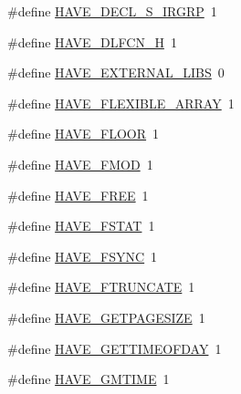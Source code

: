 \begin{DoxyCompactItemize}
\#define \hyperlink{mac_2config_2i386_2lib-src_2libsndfile_2src_2config_8h_a595bc9b53a318c90496e38ba98a79008}{H\+A\+V\+E\+\_\+\+D\+E\+C\+L\+\_\+\+S\+\_\+\+I\+R\+G\+RP}~1
\item 
\#define \hyperlink{mac_2config_2i386_2lib-src_2libsndfile_2src_2config_8h_a0ee1617ff2f6885ef384a3dd46f9b9d7}{H\+A\+V\+E\+\_\+\+D\+L\+F\+C\+N\+\_\+H}~1
\item 
\#define \hyperlink{mac_2config_2i386_2lib-src_2libsndfile_2src_2config_8h_ac17ef0b22f8ae77342384cedcf58add6}{H\+A\+V\+E\+\_\+\+E\+X\+T\+E\+R\+N\+A\+L\+\_\+\+L\+I\+BS}~0
\item 
\#define \hyperlink{mac_2config_2i386_2lib-src_2libsndfile_2src_2config_8h_ada0e7884d753aab5889056cd6b417c3c}{H\+A\+V\+E\+\_\+\+F\+L\+E\+X\+I\+B\+L\+E\+\_\+\+A\+R\+R\+AY}~1
\item 
\#define \hyperlink{mac_2config_2i386_2lib-src_2libsndfile_2src_2config_8h_ab452be2c7cc8652644e7782380300b8b}{H\+A\+V\+E\+\_\+\+F\+L\+O\+OR}~1
\item 
\#define \hyperlink{mac_2config_2i386_2lib-src_2libsndfile_2src_2config_8h_a4e31ef0be24f881a3a13e42723db7095}{H\+A\+V\+E\+\_\+\+F\+M\+OD}~1
\item 
\#define \hyperlink{mac_2config_2i386_2lib-src_2libsndfile_2src_2config_8h_a7ff023a4e451532aa34a6dace7f6255e}{H\+A\+V\+E\+\_\+\+F\+R\+EE}~1
\item 
\#define \hyperlink{mac_2config_2i386_2lib-src_2libsndfile_2src_2config_8h_adfa61bce8eaa7a8386df7a46e576db6c}{H\+A\+V\+E\+\_\+\+F\+S\+T\+AT}~1
\item 
\#define \hyperlink{mac_2config_2i386_2lib-src_2libsndfile_2src_2config_8h_adfc0b5a216545dcb6085d401b7daa1ba}{H\+A\+V\+E\+\_\+\+F\+S\+Y\+NC}~1
\item 
\#define \hyperlink{mac_2config_2i386_2lib-src_2libsndfile_2src_2config_8h_a09e31dd5fbbe2ad51c5970a2d4819542}{H\+A\+V\+E\+\_\+\+F\+T\+R\+U\+N\+C\+A\+TE}~1
\item 
\#define \hyperlink{mac_2config_2i386_2lib-src_2libsndfile_2src_2config_8h_add281e88fe03de68eb6833a0f7832cbc}{H\+A\+V\+E\+\_\+\+G\+E\+T\+P\+A\+G\+E\+S\+I\+ZE}~1
\item 
\#define \hyperlink{mac_2config_2i386_2lib-src_2libsndfile_2src_2config_8h_a32e7ff1da5763e68f44097cb23826415}{H\+A\+V\+E\+\_\+\+G\+E\+T\+T\+I\+M\+E\+O\+F\+D\+AY}~1
\item 
\#define \hyperlink{mac_2config_2i386_2lib-src_2libsndfile_2src_2config_8h_a1211879efa36b63cf62df98d350b4227}{H\+A\+V\+E\+\_\+\+G\+M\+T\+I\+ME}~1
\item 

\end{DoxyCompactItemize}
